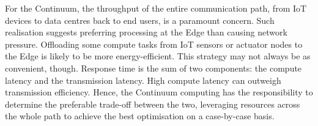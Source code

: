 
For the Continuum, the throughput of the entire communication path, from IoT devices to data centres back to end users, is a paramount concern. Such realisation suggests preferring processing at the Edge than causing network pressure. 
Offloading some compute tasks from IoT sensors or actuator nodes to the Edge is likely to be more energy-efficient. 
This strategy may not always be as convenient, though. 
Response time is the sum of two components: the compute latency and the transmission latency. High compute latency can outweigh transmission efficiency. 
Hence, the Continuum computing has the responsibility to determine the preferable trade-off between the two, leveraging resources across the whole path to achieve the best optimisation on a case-by-case basis.


